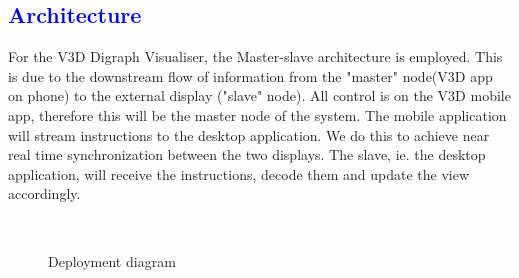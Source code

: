 \documentclass[12pt]{article}
\begin{document}
\newpage
{}
\thispagestyle{empty}
\tableofcontents
\clearpage

\textcolor{blue}{\section{Architecture}}
\begin{flushleft}
For the V3D Digraph Visualiser, the Master-slave architecture is employed. This is due to the downstream flow of information from the "master" node(V3D app on phone) to the external display ("slave" node). \newline
All control is on the V3D mobile app, therefore this will be the master node of the system. The mobile application will stream instructions to the desktop application. 
We do this to achieve near real time synchronization between the two displays. The slave, ie. the desktop application, will receive the instructions, decode them and update the view accordingly.
\end{flushleft}

\begin{figure}[p]
\vspace*{-2.7cm}
\centering
{}\\[2cm]
\caption{Deployment diagram}
\end{figure}
\end{document}
